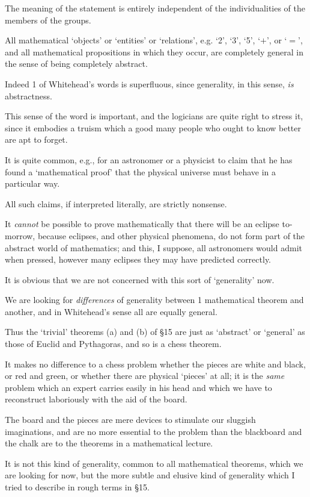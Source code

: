 \documentclass{article}
\numberwithin{equation}{section}
\begin{document}
The meaning of the statement is entirely independent of the individualities of the members of the groups.

All mathematical `objects' or `entities' or `relations', e.g. `2', `3', `5', `$+$', or `$=$', and all mathematical propositions in which they occur, are completely general in the sense of being completely abstract.

Indeed 1 of Whitehead's words is superfluous, since generality, in this sense, \textit{is} abstractness.

%
This sense of the word is important, and the logicians are quite right to stress it, since it embodies a truism which a good many people who ought to know better are apt to forget.

It is quite common, e.g., for an astronomer or a physicist to claim that he has found a `mathematical proof' that the physical universe must behave in a particular way.

All such claims, if interpreted literally, are strictly nonsense.

It \textit{cannot} be possible to prove mathematically that there will be an eclipse to-morrow, because eclipses, and other physical phenomena, do not form part of the abstract world of mathematics; and this, I suppose, all astronomers would admit when pressed, however many eclipses they may have predicted correctly.

%
It is obvious that we are not concerned with this sort of `generality' now.

We are looking for \textit{differences} of generality between 1 mathematical theorem and another, and in Whitehead's sense all are equally general.

Thus the `trivial' theorems (a) and (b) of \S15 are just as `abstract' or `general' as those of Euclid and Pythagoras, and so is a chess theorem.

It makes no difference to a chess problem whether the pieces are white and black, or red and green, or whether there are physical `pieces' at all; it is the \textit{same} problem which an expert carries easily in his head and which we have to reconstruct laboriously with the aid of the board.

The board and the pieces are mere devices to stimulate our sluggish imaginations, and are no more essential to the problem than the blackboard and the chalk are to the theorems in a mathematical lecture.

%
It is not this kind of generality, common to all mathematical theorems, which we are looking for now, but the more subtle and elusive kind of generality which I tried to describe in rough terms in \S15.
\end{document}
